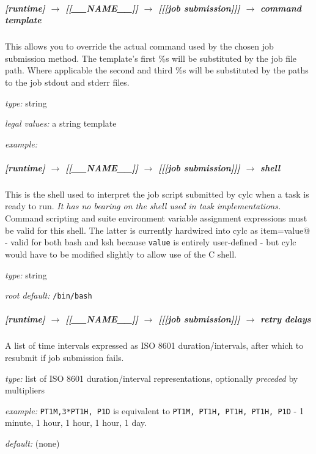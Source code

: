 \subparagraph[command template]{[runtime] $\rightarrow$ [[\_\_NAME\_\_]] $\rightarrow$ [[[job submission]]] $\rightarrow$ command template}

This allows you to override the actual command used by the chosen job
submission method. The template's first \%s will be substituted by the
job file path.  Where applicable the second and third \%s will be
substituted by the paths to the job stdout and stderr files.

\begin{myitemize}
\item {\em type:} string
\item {\em legal values:} a string template
\item {\em example:} \lstinline@llsubmit %s@
\end{myitemize}

\subparagraph[shell]{[runtime] $\rightarrow$ [[\_\_NAME\_\_]] $\rightarrow$ [[[job submission]]] $\rightarrow$ shell}
\label{JobSubShell}

This is the shell used to interpret the job script submitted by cylc
when a task is ready to run.  {\em It has no bearing on the shell used
in task implementations.} Command scripting and suite environment
variable assignment expressions must be valid for this shell. The
latter is currently hardwired into cylc as
\lstinline@export item=value@ - valid for both bash and ksh
because \lstinline=value= is entirely user-defined - but cylc would have
to be modified slightly to allow use of the C shell.

\begin{myitemize}
\item {\em type:} string
\item {\em root default:} \lstinline=/bin/bash=
\end{myitemize}

\subparagraph[retry delays]{[runtime] $\rightarrow$ [[\_\_NAME\_\_]] $\rightarrow$ [[[job submission]]] $\rightarrow$ retry delays}
\label{JobSubRefRetries}

A list of time intervals expressed as ISO 8601 duration/intervals, after
which to resubmit if job submission fails.
\begin{myitemize}
    \item {\em type:} list of ISO 8601 duration/interval representations,
    optionally {\em preceded} by multipliers
    \item {\em example:} \lstinline=PT1M,3*PT1H, P1D= is equivalent to
    \lstinline=PT1M, PT1H, PT1H, PT1H, P1D= - 1 minute, 1 hour, 1 hour, 1
    hour, 1 day.
    \item {\em default:} (none)
\end{myitemize}


